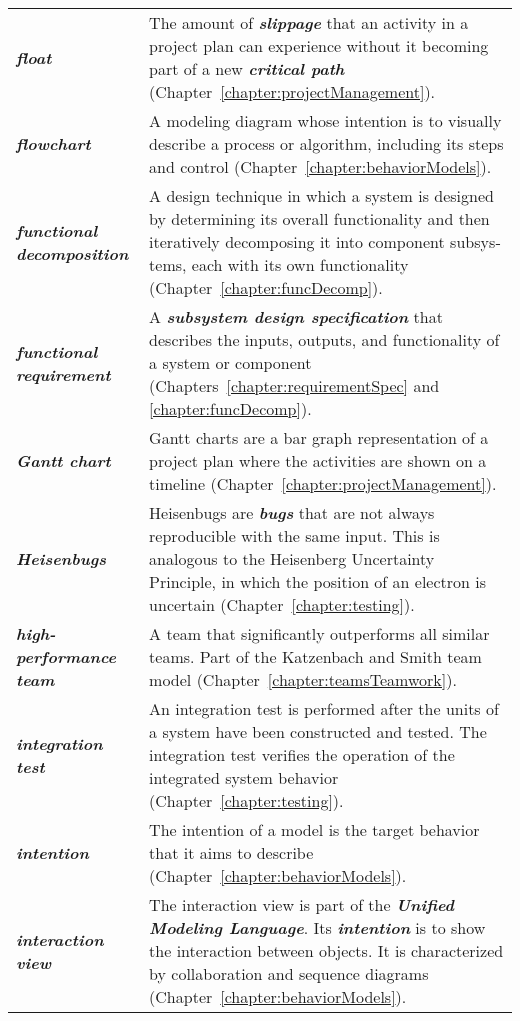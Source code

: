 \begin{longtable} { p{3cm} p{11cm}}
\emph{\textbf{float}} & The amount of \emph{\textbf{slippage}} that an
activity in a project plan can experience without it becoming part of a
new \emph{\textbf{critical path}} (Chapter~\ref{chapter:projectManagement}). \B \\
\emph{\textbf{flowchart}} & A modeling diagram whose intention is to
visually describe a process or algorithm, including its steps and
control (Chapter~\ref{chapter:behaviorModels}). \B \\
\emph{\textbf{functional decomposition}} & A design technique in which a
system is designed by de­termining its overall functionality and then
iteratively decomposing it into component subsys­tems, each with its own
functionality (Chapter~\ref{chapter:funcDecomp}). \B \\
\emph{\textbf{functional requirement}} & A \emph{\textbf{subsystem
design specification}} that describes the inputs, outputs, and
functionality of a system or component (Chapters~\ref{chapter:requirementSpec} and 
\ref{chapter:funcDecomp}). \B \\
\emph{\textbf{Gantt chart}} & Gantt charts are a bar graph
representation of a project plan where the activities are shown on a
timeline (Chapter~\ref{chapter:projectManagement}). \B \\
\emph{\textbf{Heisenbugs}} & Heisenbugs are \emph{\textbf{bugs}} that
are not always reproducible with the same input. This is analogous to
the Heisenberg Uncertainty Principle, in which the position of an
electron is uncertain (Chapter~\ref{chapter:testing}). \B \\
\emph{\textbf{high-performance team}} & A team that significantly
outperforms all similar teams. Part of the Katzenbach and Smith team
model (Chapter~\ref{chapter:teamsTeamwork}). \B \\
\emph{\textbf{integration test}} & An integration test is performed
after the units of a system have been constructed and tested. The
integration test verifies the operation of the integrated system
behavior (Chapter~\ref{chapter:testing}). \B \\
\emph{\textbf{intention}} & The intention of a model is the target
behavior that it aims to describe (Chapter~\ref{chapter:behaviorModels}). \B \\
\emph{\textbf{interaction view}} & The interaction view is part of the
\emph{\textbf{Unified Modeling Language}}. Its \emph{\textbf{intention}}
is to show the interaction between objects. It is characterized by
collaboration and sequence diagrams (Chapter~\ref{chapter:behaviorModels}). \B \\

\end{longtable}
